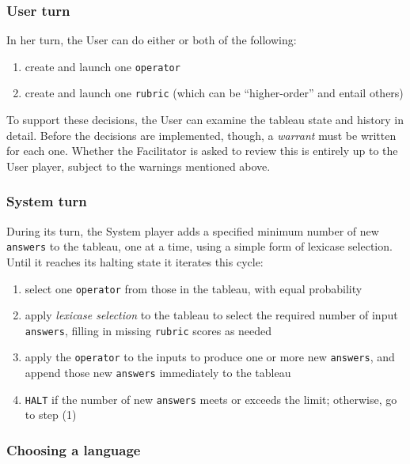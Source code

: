\subsubsection{User turn}\hypertarget{user-turn}{}\label{user-turn}

In her turn, the User can do either or both of the following:

\begin{enumerate}
\item create and launch one {\tt operator}
\item create and launch one {\tt rubric} (which can be ``higher-order'' and entail others)
\end{enumerate}

To support these decisions, the User can examine the tableau state and history in detail. Before the decisions are implemented, though, a \emph{warrant} must be written for each one. Whether the Facilitator is asked to review this is entirely up to the User player, subject to the warnings mentioned above.

\subsubsection{System turn}\hypertarget{system-turn}{}\label{system-turn}

During its turn, the System player adds a specified minimum number of new {\tt answers} to the tableau, one at a time, using a simple form of lexicase selection. Until it reaches its halting state it iterates this cycle:

\begin{enumerate}
\item select one {\tt operator} from those in the tableau, with equal probability
\item apply \emph{lexicase selection} to the tableau to select the required number of input {\tt answers}, filling in missing {\tt rubric} scores as needed
\item apply the {\tt operator} to the inputs to produce one or more new {\tt answers}, and append those new {\tt answers} immediately to the tableau
\item {\tt HALT} if the number of new {\tt answers} meets or exceeds the limit; otherwise, go to step (1)
\end{enumerate}

\subsubsection{Choosing a language}\hypertarget{choosing-a-language}{}\label{choosing-a-language}

